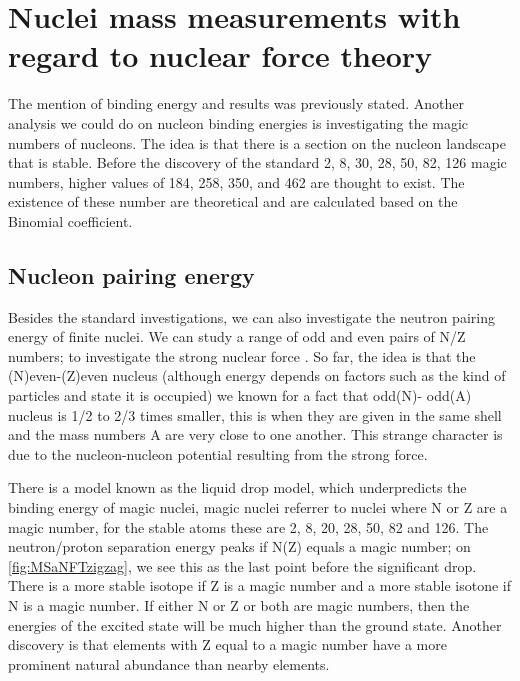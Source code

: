 \section{Nuclei mass measurements with regard to nuclear force theory}
The mention of binding energy and results was previously stated.
Another analysis we could do on nucleon binding energies is investigating the magic numbers of nucleons.
The idea is that there is a section on the nucleon landscape that is stable.
Before the discovery of the standard 2, 8, 30, 28, 50, 82, 126 magic numbers, higher values of 184, 258, 350, and 462 are thought to exist. 
The existence of these number are theoretical and are calculated based on the Binomial coefficient.

\subsection{Nucleon pairing energy}
Besides the standard investigations, we can also investigate the neutron pairing energy of finite nuclei.
We can study a range of odd and even pairs of N/Z numbers; to investigate the strong nuclear force \cite{fred_neutron_2019}.
So far, the idea is that the (N)even-(Z)even nucleus (although energy depends on factors such as the kind of particles and state it is occupied) we known for a fact that odd(N)- odd(A) nucleus is 1/2 to 2/3 times smaller, this is when they are given in the same shell and the mass numbers A are very close to one another.
This strange character is due to the nucleon-nucleon potential resulting from the strong force. \cite{jensen_elementary_1955}

There is a model known as the liquid drop model, which underpredicts the binding energy of magic nuclei, magic nuclei referrer to nuclei where N or Z are a magic number, for the stable atoms these are 2, 8, 20, 28, 50, 82 and 126.
The neutron/proton separation energy peaks if N(Z) equals a magic number; on \cref{fig:MSaNFTzigzag}, we see this as the last point before the significant drop.
There is a more stable isotope if Z is a magic number and a more stable isotone if N is a magic number.
If either N or Z or both are magic numbers, then the energies of the excited state will be much higher than the ground state.
Another discovery is that elements with Z equal to a magic number have a more prominent natural abundance than nearby elements. \cite{kumawat_description_2018}


